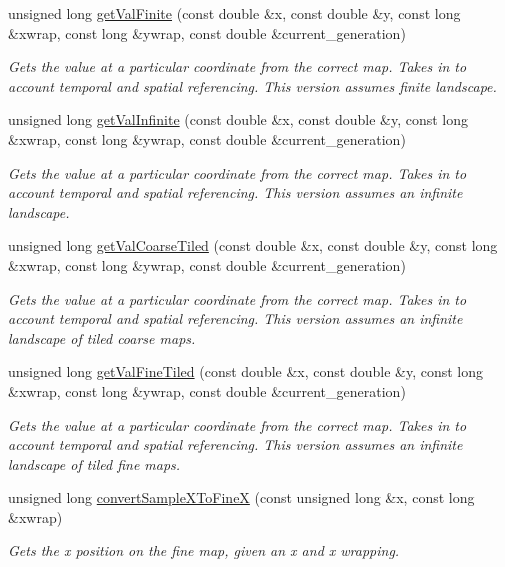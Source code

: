\begin{DoxyCompactItemize}
unsigned long \hyperlink{class_landscape_a736605cefe34af236a4f8da38276a12e}{get\+Val\+Finite} (const double \&x, const double \&y, const long \&xwrap, const long \&ywrap, const double \&current\+\_\+generation)
\begin{DoxyCompactList}\small\item\em Gets the value at a particular coordinate from the correct map. Takes in to account temporal and spatial referencing. This version assumes finite landscape. \end{DoxyCompactList}\item 
unsigned long \hyperlink{class_landscape_a98762916e5acb685338016b88abae251}{get\+Val\+Infinite} (const double \&x, const double \&y, const long \&xwrap, const long \&ywrap, const double \&current\+\_\+generation)
\begin{DoxyCompactList}\small\item\em Gets the value at a particular coordinate from the correct map. Takes in to account temporal and spatial referencing. This version assumes an infinite landscape. \end{DoxyCompactList}\item 
unsigned long \hyperlink{class_landscape_a4b9ec1da69d6ce6720da7cd57cddad30}{get\+Val\+Coarse\+Tiled} (const double \&x, const double \&y, const long \&xwrap, const long \&ywrap, const double \&current\+\_\+generation)
\begin{DoxyCompactList}\small\item\em Gets the value at a particular coordinate from the correct map. Takes in to account temporal and spatial referencing. This version assumes an infinite landscape of tiled coarse maps. \end{DoxyCompactList}\item 
unsigned long \hyperlink{class_landscape_a4e3ee0a3c83904131415abdaba111218}{get\+Val\+Fine\+Tiled} (const double \&x, const double \&y, const long \&xwrap, const long \&ywrap, const double \&current\+\_\+generation)
\begin{DoxyCompactList}\small\item\em Gets the value at a particular coordinate from the correct map. Takes in to account temporal and spatial referencing. This version assumes an infinite landscape of tiled fine maps. \end{DoxyCompactList}\item 
unsigned long \hyperlink{class_landscape_a03e9dfbcd6eab3532bf8cf333dd43513}{convert\+Sample\+X\+To\+FineX} (const unsigned long \&x, const long \&xwrap)
\begin{DoxyCompactList}\small\item\em Gets the x position on the fine map, given an x and x wrapping. \end{DoxyCompactList}\item 

\end{DoxyCompactItemize}
